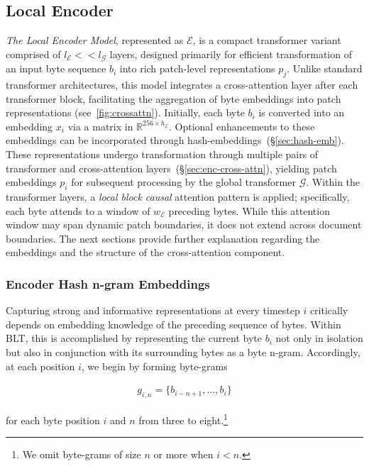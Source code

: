 \subsection{Local Encoder}
\label{section:local}

\textit{The Local Encoder Model}, represented as $\mathcal{E}$, is a compact transformer variant comprised of $l_{\mathcal{E}} << l_{\mathcal{G}}$ layers, designed primarily for efficient transformation of an input byte sequence $b_i$ into rich patch-level representations $p_j$. Unlike standard transformer architectures, this model integrates a cross-attention layer after each transformer block, facilitating the aggregation of byte embeddings into patch representations (see~\autoref{fig:crossattn}).  
Initially, each byte $b_i$ is converted into an embedding $x_i$ via a matrix in $\mathbb{R}^{256 \times h_{\mathcal{E}}}$. Optional enhancements to these embeddings can be incorporated through hash-embeddings~(\S\ref{sec:hash-emb}).  
These representations undergo transformation through multiple pairs of transformer and cross-attention layers~(\S\ref{sec:enc-cross-attn}), yielding patch embeddings $p_i$ for subsequent processing by the global transformer $\mathcal{G}$.  
Within the transformer layers, a \textit{local block causal} attention pattern is applied; specifically, each byte attends to a window of $w_{\mathcal{E}}$ preceding bytes. While this attention window may span dynamic patch boundaries, it does not extend across document boundaries. The next sections provide further explanation regarding the embeddings and the structure of the cross-attention component.

\subsubsection{Encoder Hash n-gram Embeddings}
\label{sec:ngram-emb}
\label{sec:hash-emb}
Capturing strong and informative representations at every timestep $i$ critically depends on embedding knowledge of the preceding sequence of bytes. Within {\textsc BLT}, this is accomplished by representing the current byte $b_i$ not only in isolation but also in conjunction with its surrounding bytes as a byte n-gram. Accordingly, at each position $i$, we begin by forming byte-grams

\begin{align}
    g_{i,n}=\{b_{i-n + 1},\ldots, b_i\}
\end{align}

for each byte position $i$ and $n$ from three to eight.\footnote{
We omit byte-grams of size $n$ or more when $i<n$. }

